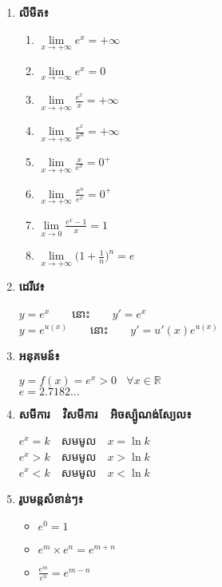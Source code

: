 \documentclass[12pt, a4paper]{article}
\begin{document}
\maketitle
\begin{enumerate}[m]
	\item \textbf{\sffamily លីមីត៖}
	\begin{enumerate}[k,2]
		\item $\lim\limits_{x\to+\infty}e^{x}=+\infty$
		\item $\lim\limits_{x\to-\infty}e^{x}=0$
		\item $\lim\limits_{x\to+\infty}\frac{e^x}{x}=+\infty$		
		\item $\lim\limits_{x\to+\infty}\frac{e^x}{x^n}=+\infty$
		\item $\lim\limits_{x\to+\infty}\frac{x}{e^x}=0^+$
		\item $\lim\limits_{x\to+\infty}\frac{x^n}{e^x}=0^+$
		\item $\lim\limits_{x\to 0}\frac{e^x-1}{x}=1$
		\item $\lim\limits_{x\to +\infty}\bigg(1+\frac{1}{n}\bigg)^n=e$
	\end{enumerate}
	\item \textbf{\sffamily ដេរីវេ៖}
	\begin{center}
		$y=e^x$~~~~នោះ~~~~$y'=e^x$\\
		$y=e^{u(x)}$~~~~នោះ~~~~$y'=u'(x)e^{u(x)}$
	\end{center}
	\item \textbf{\sffamily អនុគមន៍៖}
	\begin{center}
		$y=f(x)=e^x>0~~~~\forall x\in\mathbb{R}$\\
		$e=2.7182...$
	\end{center}
	\item \textbf{\sffamily សមីការ~~វិសមីការ~~អិចស្ប៉ូណង់ស្យែល៖}
	\begin{center}
		$e^x=k$~~សមមូល~~$x=\ln k$\\
		$e^x>k$~~សមមូល~~$x>\ln k$\\
		$e^x<k$~~សមមូល~~$x<\ln k$
	\end{center}\newpage
	\item \textbf{\sffamily រូបមន្តសំខាន់ៗ៖}
	\begin{multicols}{3}
		\begin{itemize}
			\item $e^0=1$
			\item $e^m\times e^n=e^{m+n}$
			\item $\frac{e^m}{e^n}=e^{m-n}$ 
		\end{itemize}

\end{multicols}
\end{enumerate}
\end{document}
